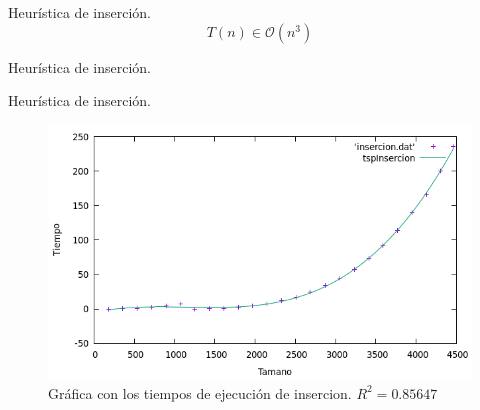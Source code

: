 \documentclass[10pt, xcolor=table]{beamer}
\begin{document}
\begin{frame}[fragile]{Heurística de inserción. }
\[
	T(n) \in \mathcal{O} (n^3)
\]
\end{frame}

\begin{frame}[fragile]{Heurística de inserción. }
\begin{table}[h!]
 	\centering
 	\footnotesize
 	\caption{Experiencia empírica de inserción}
 \end{table}
\end{frame}

\begin{frame}[fragile]{Heurística de inserción. }
 \begin{figure}[h!]
 	\centering
 	\includegraphics[scale=0.5]{./Images/insercion.png}
 	\caption{Gráfica con los tiempos de ejecución de insercion. \(R^2 = 0.85647\)}
 \end{figure}
\end{frame}
\end{document}
